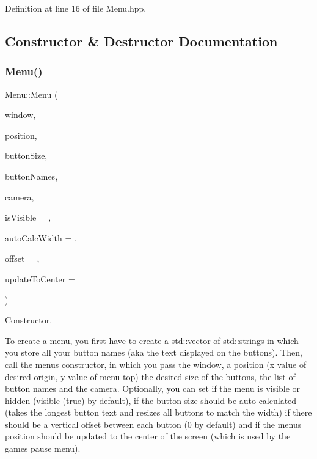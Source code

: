 Definition at line 16 of file Menu.\+hpp.



\subsection{Constructor \& Destructor Documentation}
\mbox{\label{class_menu_accc796ef85a8a1834ebf5cd04db2334c}} 
\subsubsection{\texorpdfstring{Menu()}{Menu()}}
{\footnotesize\ttfamily Menu\+::\+Menu (\begin{DoxyParamCaption}\item[{sf\+::\+Render\+Window \&}]{window,  }\item[{sf\+::\+Vector2f}]{position,  }\item[{sf\+::\+Vector2f}]{button\+Size,  }\item[{std\+::vector$<$ std\+::string $>$}]{button\+Names,  }\item[{\hyperlink{class_camera}{Camera} \&}]{camera,  }\item[{bool}]{is\+Visible = {},  }\item[{bool}]{auto\+Calc\+Width = {},  }\item[{int}]{offset = {},  }\item[{bool}]{update\+To\+Center = {} }\end{DoxyParamCaption})}



Constructor. 

To create a menu, you first have to create a std\+::vector of std\+::strings in which you store all your button names (aka the text displayed on the buttons). Then, call the menu\textquotesingle{}s constructor, in which you pass the window, a position (x value of desired origin, y value of menu top) the desired size of the buttons, the list of button names and the camera. Optionally, you can set if the menu is visible or hidden (visible (true) by default), if the button size should be auto-\/calculated (takes the longest button text and resizes all buttons to match the width) if there should be a vertical offset between each button (0 by default) and if the menu\textquotesingle{}s position should be updated to the center of the screen (which is used by the game\textquotesingle{}s pause menu). 

